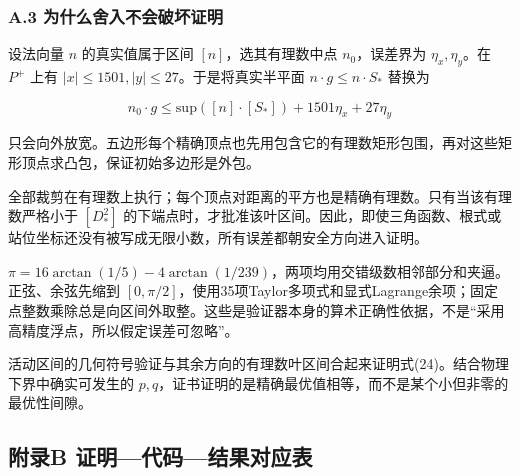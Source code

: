\documentclass[
  11pt,
  fontset=none]{ctexart}
\begin{document}
\subsubsection{A.3
为什么舍入不会破坏证明}\label{a.3-ux4e3aux4ec0ux4e48ux820dux5165ux4e0dux4f1aux7834ux574fux8bc1ux660e}

设法向量 \(n\) 的真实值属于区间 \([n]\)，选其有理数中点
\(n_0\)，误差界为 \(\eta_x,\eta_y\)。在 \(P^{\text{+}}\) 上有
\(|x|\le1501,|y|\le27\)。于是将真实半平面
\(n\cdot g\le n\cdot S_{\text{*}}\) 替换为

\[
n_0\cdot g\le\text{sup}([n]\cdot[S_{\text{*}}])+1501\eta_x+27\eta_y \tag{A7}
\]

只会向外放宽。五边形每个精确顶点也先用包含它的有理数矩形包围，再对这些矩形顶点求凸包，保证初始多边形是外包。

全部裁剪在有理数上执行；每个顶点对距离的平方也是精确有理数。只有当该有理数严格小于
\([D_{\text{*}}^2]\)
的下端点时，才批准该叶区间。因此，即使三角函数、根式或站位坐标还没有被写成无限小数，所有误差都朝安全方向进入证明。

\(\pi=16\arctan(1/5)-4\arctan(1/239)\)，两项均用交错级数相邻部分和夹逼。正弦、余弦先缩到
\([0,\pi/2]\)，使用35项Taylor多项式和显式Lagrange余项；固定点整数乘除总是向区间外取整。这些是验证器本身的算术正确性依据，不是``采用高精度浮点，所以假定误差可忽略''。

活动区间的几何符号验证与其余方向的有理数叶区间合起来证明式(24)。结合物理下界中确实可发生的
\(p,q\)，证书证明的是精确最优值相等，而不是某个小但非零的最优性间隙。

\subsection{附录B
证明---代码---结果对应表}\label{ux9644ux5f55b-ux8bc1ux660eux4ee3ux7801ux7ed3ux679cux5bf9ux5e94ux8868}
\end{document}
